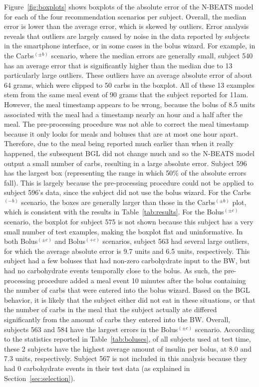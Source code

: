 \documentclass[journal,article,submit,moreauthors,pdftex]{Definitions/mdpi}
\begin{document}
Figure~\ref{fig:boxplots} shows boxplots of the absolute error of the N-BEATS model for each of the four recommendation scenarios per subject. Overall, the median error is lower than the average error, which is skewed by outliers. Error analysis reveals that outliers are largely caused by noise in the data reported by subjects in the smartphone interface, or in some cases in the bolus wizard. For example, in the Carbs$^{(\pm b)}$ scenario, where the median errors are generally small, subject 540 has an average error that is significantly higher than the median due to 13 particularly large outliers. These outliers have an average absolute error of about 64 grams, which were clipped to 50 carbs in the boxplot. All of these 13 examples stem from the same meal event of 90 grams that the subject reported for 11am. However, the meal timestamp appears to be wrong, because the bolus of 8.5 units associated with the meal had a timestamp nearly an hour and a half after the meal. The pre-processing procedure was not able to correct the meal timestamp because it only looks for meals and boluses that are at most one hour apart. Therefore, due to the meal being reported much earlier than when it really happened, the subsequent BGL did not change much and so the N-BEATS model output a small number of carbs, resulting in a large absolute error. Subject 596 has the largest box (representing the range in which 50\% of the absolute errors fall). This is largely because the pre-processing procedure could not be applied to subject 596's data, since the subject did not use the bolus wizard. For the Carbs$^{(-b)}$ scenario, the boxes are generally larger than those in the Carbs$^{(\pm b)}$ plot, which is consistent with the results in Table~\ref{tab:results}.
For the Bolus$^{(\pm c)}$ scenario, the boxplot for subject 575 is not shown because this subject has a very small number of test examples, making the boxplot flat and uninformative. In both Bolus$^{(\pm c)}$ and Bolus$^{(+c)}$ scenarios, subject 563 had several large outliers, for which the average absolute error is 9.7 units and 6.5 units, respectively. This subject had a few boluses that had non-zero carbohydrate input to the BW, but had no carbohydrate events temporally close to the bolus. As such, the pre-processing procedure added a meal event 10 minutes after the bolus containing the number of carbs that were entered into the bolus wizard. Based on the BGL behavior, it is likely that the subject either did not eat in these situations, or that the number of carbs in the meal that the subject actually ate differed significantly from the amount of carbs they entered into the BW. Overall, subjects 563 and 584 have the largest errors in the Bolus$^{(\pm c)}$ scenario. According to the statistics reported in Table~\ref{tab:boluses}, of all subjects used at test time, these 2 subjects have the highest average amount of insulin per bolus, at 8.0 and 7.3 units, respectively. Subject 567 is not included in this analysis because they had 0 carbohydrate events in their test data (as explained in Section~\ref{sec:selection}).
\end{document}
